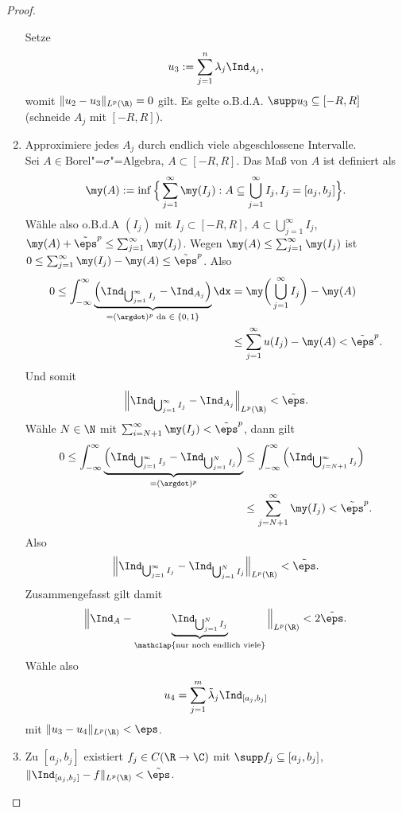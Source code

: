 \begin{st}
\begin{proof}
\begin{enumerate}[1)]
				Setze 
				\[
					u_3 := \sum_{j=1}^n \lambda_j \Ind_{A_j},
				\]
				womit $\|u_2 - u_3\|_{L^p(\R)} = 0$ gilt.
				Es gelte o.B.d.A. $\supp u_3 \subset [-R,R]$ (schneide $A_j$ mit $[-R,R]$).
			\item
				Approximiere jedes $A_j$ durch endlich viele abgeschlossene Intervalle. \\
				Sei $A \in \text{Borel"=$\sigma$"=Algebra}$, $A \subset [-R,R]$.
				Das Maß von $A$ ist definiert als
				\[
					\my(A) := \inf \Big\{ \sum_{j=1}^\infty \my(I_j) : A \subset \bigcup_{j=1}^\infty I_j, I_j = [a_j, b_j] \Big\}.
				\]
				Wähle also o.B.d.A $(I_j)$ mit $I_j \subset [-R,R]$, $A \subset \bigcup_{j=1}^\infty I_j$, $\my(A) + \tilde \eps^p \le \sum_{j=1}^\infty \my(I_j)$.
				Wegen $\my(A) \le \sum_{j=1}^\infty \my(I_j)$ ist $0 \le \sum_{j=1}^\infty \my(I_j) - \my(A) \le \tilde \eps^p$.
				Also
				\begin{align*}
					0 
					\le \int_{-\infty}^\infty \underbrace{\Big(\Ind_{\bigcup_{j=1}^\infty I_j} - \Ind_{A_j}\Big)}_{=(\argdot)^p \text{ da $\in \{0,1\}$}} \dx
					&= \my\bigg(\bigcup_{j=1}^\infty I_j \bigg) - \my(A) \\
					&\le \sum_{j=1}^\infty u(I_j) - \my(A)
					< \tilde \eps^p.
				\end{align*}
				Und somit
				\[
					\Big\|\Ind_{\bigcup_{j=1}^\infty I_j} - \Ind_{A_j}\Big\|_{L^p(\R)} < \tilde \eps.
				\]
				Wähle $N \in \N$ mit $\sum_{i=N+1}^\infty \my(I_j) < \tilde \eps^p$, dann gilt
				\begin{align*}
					0 
					\le \int_{-\infty}^\infty \underbrace{\Big(\Ind_{\bigcup_{j=1}^\infty I_j} - \Ind_{\bigcup_{j=1}^N I_j}\Big)}_{=(\argdot)^p}
					&\le \int_{-\infty}^\infty \Big(\Ind_{\bigcup_{j=N+1}^\infty I_j}\Big) \\
					&\le \sum_{j=N+1}^\infty \my(I_j) 
					< \tilde \eps^p.
				\end{align*}
				Also
				\[
					\Big\| \Ind_{\bigcup_{j=1}^\infty I_j} - \Ind_{\bigcup_{j=1}^N I_j} \Big\|_{L^p(\R)} < \tilde \eps.
				\]
				Zusammengefasst gilt damit
				\[
					\Big\| \Ind_A - \underbrace{\Ind_{\bigcup_{j=1}^N I_j}}_{\mathclap{\text{nur noch endlich viele}}} \Big\|_{L^p(\R)} < 2 \tilde \eps.
				\]
				Wähle also
				\[
					u_4 = \sum_{j=1}^m  \tilde \lambda_j \Ind_{[a_j,b_j]}
				\]
				mit $\|u_3 - u_4\|_{L^p(\R)} < \eps$.
			\item
				Zu $[a_j,b_j]$ existiert $f_j \in C(\R \to \C)$ mit $\supp f_j \subset [a_j, b_j]$, $\|\Ind_{[a_j,b_j]} - f\|_{L^p(\R)} < \tilde \eps$.


\end{enumerate}
\end{proof}
\end{st}
